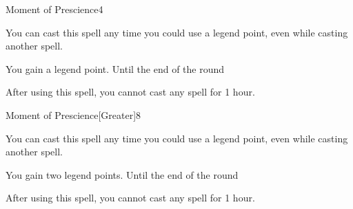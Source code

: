 \begin{spellsection}{Moment of Prescience}{4}
    \begin{spellheader}
    \end{spellheader}
    \begin{spellcontent}
        \begin{spelltargetinginfo}
            \spellspecial You can cast this spell any time you could use a legend point, even while casting another spell.
        \end{spelltargetinginfo}
        \begin{spelleffects}
            \spelleffect You gain a legend point.
            \spelldur Until the end of the round
        \end{spelleffects}
    \end{spellcontent}
    \begin{spellfooter}
        \spellnotes After using this spell, you cannot cast any  spell for 1 hour.
        \miscastexplode
    \end{spellfooter}
\end{spellsection}

\begin{spellsection}{Moment of Prescience}[Greater]{8}
    \begin{spellheader}
    \end{spellheader}
    \begin{spellcontent}
        \begin{spelltargetinginfo}
            \spellspecial You can cast this spell any time you could use a legend point, even while casting another spell.
        \end{spelltargetinginfo}
        \begin{spelleffects}
            \spelleffect You gain two legend points.
            \spelldur Until the end of the round
        \end{spelleffects}
    \end{spellcontent}
    \begin{spellfooter}
        \spellnotes After using this spell, you cannot cast any  spell for 1 hour.
        \miscastexplode
    \end{spellfooter}
\end{spellsection}

